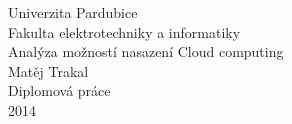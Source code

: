 
\renewcommand{\baselinestretch}{1} %
\begin{center}

\Large\sc
Univerzita Pardubice\\
Fakulta elektrotechniky a informatiky\\[70mm]


\Huge\sc
Analýza možností nasazení Cloud computing\\[20mm]

Matěj Trakal\\[55mm]


\Large\sc
Diplomová práce\\
2014\\
\end{center}
\normalsize %
\newpage